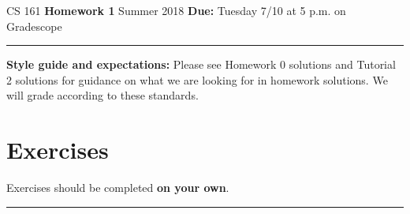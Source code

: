 \documentclass{article}
\begin{document}
\noindent
CS 161 \hfill \textbf{Homework 1} \newline 
Summer 2018 \hfill \textbf{Due:} Tuesday 7/10 at 5 p.m. on Gradescope

\noindent\rule{\linewidth}{0.4pt}

\noindent\textbf{Style guide and expectations:} Please see Homework 0 solutions
  and Tutorial 2 solutions for guidance on what we are looking for in homework
  solutions. We will grade according to these standards.

\section*{Exercises}

Exercises should be completed \textbf{on your own}.

\noindent\rule{\linewidth}{1.0pt}
\end{document}
